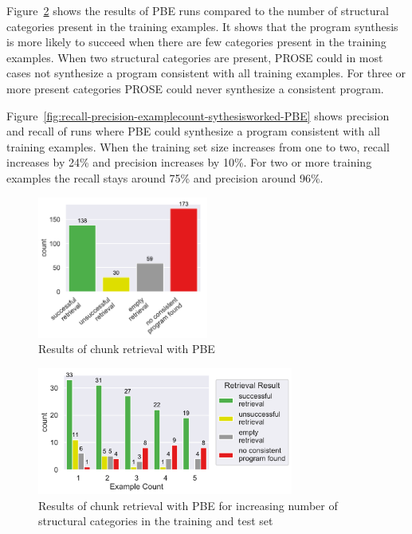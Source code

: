 \documentclass[\myrootdir/main.tex]{subfiles}
\begin{document}
Figure~\ref{fig:failure-reason-categorycount-PBE} shows the results of PBE runs compared to the number of structural categories present in the training examples.
It shows that the program synthesis is more likely to succeed when there are few categories present in the training examples.
When two structural categories are present, PROSE could in most cases not synthesize a program consistent with all training examples.
For three or more present categories PROSE could never synthesize a consistent program.

Figure~\ref{fig:recall-precision-examplecount-sythesisworked-PBE} shows precision and recall of runs where PBE could synthesize a program consistent with all training examples.
When the training set size increases from one to two, recall increases by 24\% and precision increases by 10\%.
For two or more training examples the recall stays around 75\% and precision around 96\%.

\begin{figure}[htbp]
		\centering
		\includegraphics[width=0.5\textwidth, clip]{img/big-study/failure-reason-PBE.pdf}
		\caption{Results of chunk retrieval with PBE}
		\label{fig:failure-reason-PBE}
\end{figure}

\begin{figure}[htbp]
		\centering
		\includegraphics[width=0.75\textwidth, clip]{img/big-study/failure-reason-categorycount-PBE.pdf}
		\caption{Results of chunk retrieval with PBE for increasing number of structural categories in the training and test set}
		\label{fig:failure-reason-categorycount-PBE}
\end{figure}
\end{document}
